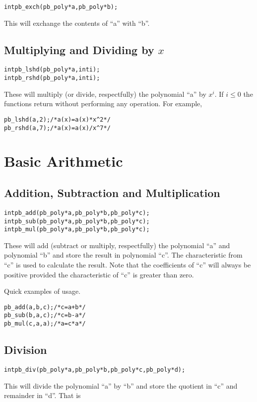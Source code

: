 \documentclass[b5paper]{book}
\begin{document}
\begin{alltt}
int pb_exch(pb_poly *a, pb_poly *b);
\end{alltt}
This will exchange the contents of ``a'' with ``b''.  

\section{Multiplying and Dividing by $x$}
 
\begin{alltt}
int pb_lshd(pb_poly *a, int i);
int pb_rshd(pb_poly *a, int i);
\end{alltt}
These will multiply (or divide, respectfully) the polynomial ``a'' by $x^i$.  If $i \le 0$ the functions return without
performing any operation.  For example,

\begin{alltt}
pb_lshd(a, 2);  /* a(x) = a(x) * x^2 */
pb_rshd(a, 7);  /* a(x) = a(x) / x^7 */
\end{alltt}

\chapter{Basic Arithmetic}
\section{Addition, Subtraction and Multiplication}
 
\begin{alltt}
int pb_add(pb_poly *a, pb_poly *b, pb_poly *c);
int pb_sub(pb_poly *a, pb_poly *b, pb_poly *c);
int pb_mul(pb_poly *a, pb_poly *b, pb_poly *c);
\end{alltt}

These will add (subtract or multiply, respectfully) the polynomial ``a'' and polynomial ``b'' and store the result in 
polynomial ``c''.  The characteristic from  ``c'' is used to calculate the result.  Note that the coefficients of ``c'' 
will always be positive provided the characteristic of ``c'' is greater than zero.  

Quick examples of usage.

\begin{alltt}
pb_add(a, b, c);  /* c = a + b */
pb_sub(b, a, c);  /* c = b - a */
pb_mul(c, a, a);  /* a = c * a */
\end{alltt}

\section{Division}
\begin{alltt}
int pb_div(pb_poly *a, pb_poly *b, pb_poly *c, pb_poly *d);
\end{alltt}
This will divide the polynomial ``a'' by ``b'' and store the quotient in ``c'' and remainder in ``d''.  That is
\end{document}
